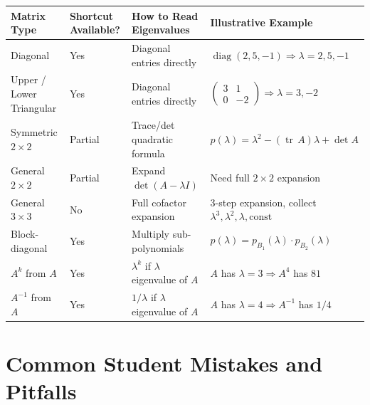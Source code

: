 \documentclass[12pt,a4paper]{article}
\begin{document}
\begin{center}
\renewcommand{\arraystretch}{1.4}
\begin{tabular}{@{}p{3cm} p{3.5cm} p{3.5cm} p{4cm}@{}}
\toprule
\textbf{Matrix Type} & \textbf{Shortcut Available?} & \textbf{How to Read Eigenvalues} & \textbf{Illustrative Example} \\
\midrule
Diagonal & Yes & Diagonal entries directly & $\operatorname{diag}(2,5,-1) \Rightarrow \lambda=2,5,-1$ \\
\addlinespace
Upper / Lower Triangular & Yes & Diagonal entries directly & $\begin{pmatrix}3&1\\0&-2\end{pmatrix}\Rightarrow\lambda=3,-2$ \\
\addlinespace
Symmetric $2\times2$ & Partial & Trace/det quadratic formula & $p(\lambda)=\lambda^2-(\operatorname{tr}\,A)\lambda+\det A$ \\
\addlinespace
General $2\times2$ & Partial & Expand $\det(A-\lambda I)$ & Need full $2\times2$ expansion \\
\addlinespace
General $3\times3$ & No & Full cofactor expansion & 3-step expansion, collect $\lambda^3,\lambda^2,\lambda,\text{const}$ \\
\addlinespace
Block-diagonal & Yes & Multiply sub-polynomials & $p(\lambda)=p_{B_1}(\lambda)\cdot p_{B_2}(\lambda)$ \\
\addlinespace
$A^k$ from $A$ & Yes & $\lambda^k$ if $\lambda$ eigenvalue of $A$ & $A$ has $\lambda=3 \Rightarrow A^4$ has $81$ \\
\addlinespace
$A^{-1}$ from $A$ & Yes & $1/\lambda$ if $\lambda$ eigenvalue of $A$ & $A$ has $\lambda=4 \Rightarrow A^{-1}$ has $1/4$ \\
\bottomrule
\end{tabular}
\end{center}

\section{Common Student Mistakes and Pitfalls}
\end{document}
